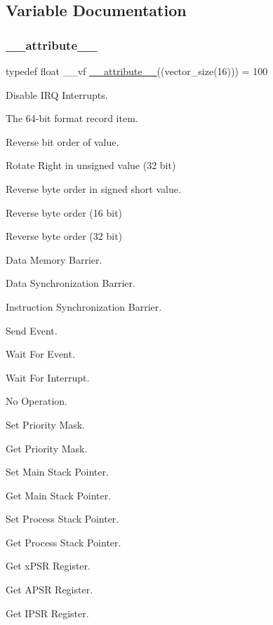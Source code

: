 \subsection{Variable Documentation}
\mbox{\label{group__CMSIS__Core__RegAccFunctions_ga64f4b781c8a7c676397f725a01427270}} 
\subsubsection{\texorpdfstring{\_\_attribute\_\_}{\_\_attribute\_\_}}
{\footnotesize\ttfamily typedef float \+\_\+\+\_\+vf \mbox{\hyperlink{struct____attribute____}{\+\_\+\+\_\+attribute\+\_\+\+\_\+}}((vector\+\_\+size(16))) = 100}



Disable I\+RQ Interrupts. 

The 64-\/bit format record item.

Reverse bit order of value.

Rotate Right in unsigned value (32 bit)

Reverse byte order in signed short value.

Reverse byte order (16 bit)

Reverse byte order (32 bit)

Data Memory Barrier.

Data Synchronization Barrier.

Instruction Synchronization Barrier.

Send Event.

Wait For Event.

Wait For Interrupt.

No Operation.

Set Priority Mask.

Get Priority Mask.

Set Main Stack Pointer.

Get Main Stack Pointer.

Set Process Stack Pointer.

Get Process Stack Pointer.

Get x\+P\+SR Register.

Get A\+P\+SR Register.

Get I\+P\+SR Register.

